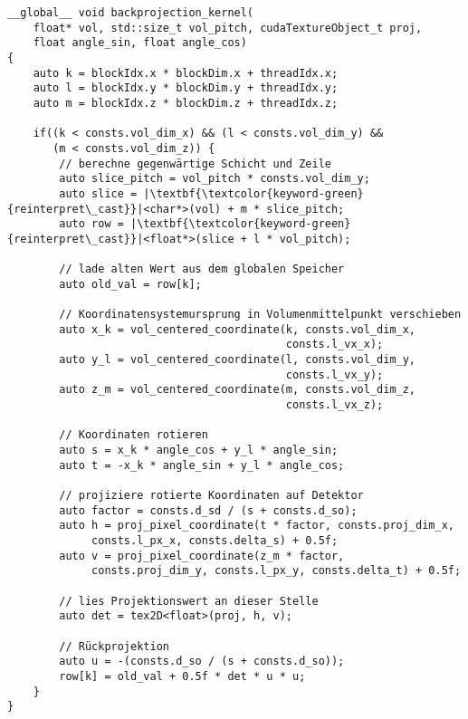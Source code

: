 \begin{code}
\begin{verbatim}
__global__ void backprojection_kernel(
    float* vol, std::size_t vol_pitch, cudaTextureObject_t proj,
    float angle_sin, float angle_cos)
{
    auto k = blockIdx.x * blockDim.x + threadIdx.x;
    auto l = blockIdx.y * blockDim.y + threadIdx.y;
    auto m = blockIdx.z * blockDim.z + threadIdx.z;

    if((k < consts.vol_dim_x) && (l < consts.vol_dim_y) &&
       (m < consts.vol_dim_z)) {
        // berechne gegenwärtige Schicht und Zeile
        auto slice_pitch = vol_pitch * consts.vol_dim_y;
        auto slice = |\textbf{\textcolor{keyword-green}{reinterpret\_cast}}|<char*>(vol) + m * slice_pitch;
        auto row = |\textbf{\textcolor{keyword-green}{reinterpret\_cast}}|<float*>(slice + l * vol_pitch);

        // lade alten Wert aus dem globalen Speicher
        auto old_val = row[k];

        // Koordinatensystemursprung in Volumenmittelpunkt verschieben
        auto x_k = vol_centered_coordinate(k, consts.vol_dim_x,
                                           consts.l_vx_x);
        auto y_l = vol_centered_coordinate(l, consts.vol_dim_y,
                                           consts.l_vx_y);
        auto z_m = vol_centered_coordinate(m, consts.vol_dim_z,
                                           consts.l_vx_z);

        // Koordinaten rotieren
        auto s = x_k * angle_cos + y_l * angle_sin;
        auto t = -x_k * angle_sin + y_l * angle_cos;

        // projiziere rotierte Koordinaten auf Detektor
        auto factor = consts.d_sd / (s + consts.d_so);
        auto h = proj_pixel_coordinate(t * factor, consts.proj_dim_x,
             consts.l_px_x, consts.delta_s) + 0.5f;
        auto v = proj_pixel_coordinate(z_m * factor,
             consts.proj_dim_y, consts.l_px_y, consts.delta_t) + 0.5f;

        // lies Projektionswert an dieser Stelle
        auto det = tex2D<float>(proj, h, v);

        // Rückprojektion
        auto u = -(consts.d_so / (s + consts.d_so));
        row[k] = old_val + 0.5f * det * u * u;
    }
}
\end{verbatim}
\label{source:impl_bp}
\end{code}

